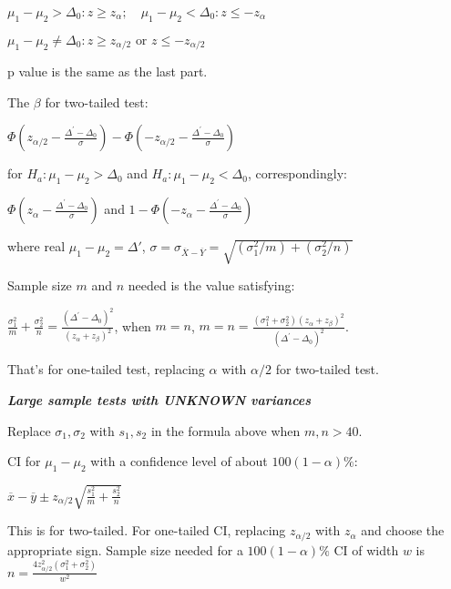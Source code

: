 \documentclass{article}
\newcommand{\smalltitle}[1]{
	\noindent
	\textbf{\textit{#1}}
}
\begin{document}
	$
	{\mu_1 - \mu_2 > \Delta_0} : {z\geq z_\alpha} ;\quad
	{\mu_1 - \mu_2 < \Delta_0} : {z\leq -z_\alpha} 
	$
	
	$
	{\mu_1 - \mu_2 \neq \Delta_0} : { z\geq z_{\alpha/2} \text{ or } z\leq -z_{\alpha/2} }
	$
	
	p value is the same as the last part.
	
	The $\beta$ for two-tailed test:
	
	$\Phi \left( z _ { \alpha / 2 } - \frac { \Delta ^ { \prime } - \Delta _ { 0 } } { \sigma } \right) - \Phi \left( - z _ { \alpha / 2 } - \frac { \Delta ^ { \prime } - \Delta _ { 0 } } { \sigma } \right)$
	
	for $H_a: \mu_1 - \mu_2 > \Delta_0$ and $H_a: \mu_1 - \mu_2 < \Delta_0$, correspondingly:
	
	$\Phi \left( z _ { \alpha } - \frac { \Delta ^ { \prime } - \Delta _ { 0 } } { \sigma } \right)$ and $1 - \Phi \left( - z _ { \alpha } - \frac { \Delta ^ { \prime } - \Delta _ { 0 } } { \sigma } \right)$
	
	where real $\mu_1 - \mu_2 = \Delta'$, $\sigma = \sigma _ { \overline { X } - \overline { Y } } = \sqrt { \left( \sigma _ { 1 } ^ { 2 } / m \right) + \left( \sigma _ { 2 } ^ { 2 } / n \right) }$
	
	Sample size $m$ and $n$ needed is the value satisfying:
	
	$\frac { \sigma _ { 1 } ^ { 2 } } { m } + \frac { \sigma _ { 2 } ^ { 2 } } { n } = \frac { \left( \Delta ^ { \prime } - \Delta _ { 0 } \right) ^ { 2 } } { \left( z _ { \alpha } + z _ { \beta } \right) ^ { 2 } }$,
	when $m=n$, $m = n = \frac { \left( \sigma _ { 1 } ^ { 2 } + \sigma _ { 2 } ^ { 2 } \right) \left( z _ { \alpha } + z _ { \beta } \right) ^ { 2 } } { \left( \Delta ^ { \prime } - \Delta _ { 0 } \right) ^ { 2 } }$.
	
	\noindent
	That's for one-tailed test, replacing $\alpha$ with $\alpha/2$ for two-tailed test.
	
	\smalltitle{Large sample tests with UNKNOWN variances}
	
	Replace $\sigma_{ 1 }, \sigma_{ 2 }$ with $s_1,s_2$ in the formula above when $m,n > 40$.
	
	CI for $\mu_1 - \mu_2$ with a confidence level of about $100(1-\alpha)\%$:
	
	$\overline { x } - \overline { y } \pm z _ { \alpha / 2 } \sqrt { \frac { s _ { 1 } ^ { 2 } } { m } + \frac { s _ { 2 } ^ { 2 } } { n } }$
	
	This is for two-tailed. For one-tailed CI, replacing $z_{\alpha/2}$ with $z_\alpha$ and choose the appropriate sign.
	Sample size needed for a $100(1-\alpha)\%$ CI of width $w$ is $n = \frac { 4 z _ { \alpha / 2 } ^ { 2 } \left( \sigma _ { 1 } ^ { 2 } + \sigma _ { 2 } ^ { 2 } \right) } { w ^ { 2 } }$
	
\end{document}
